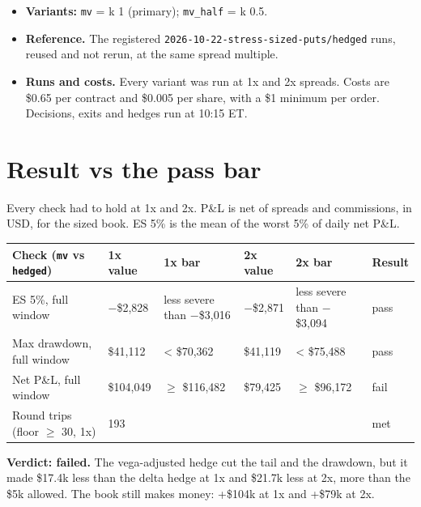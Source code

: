 \documentclass{article}
\begin{document}
\begin{itemize}
\begin{itemize}
\end{itemize}

\item \textbf{Variants:} \texttt{mv} = k 1 (primary); \texttt{mv\_\allowbreak{}half} = k 0.5.

\item \textbf{Reference.} The registered \texttt{2026-\allowbreak{}10-\allowbreak{}22-\allowbreak{}stress-\allowbreak{}sized-\allowbreak{}puts/\allowbreak{}hedged} runs, reused and not rerun, at the same spread multiple.

\item \textbf{Runs and costs.} Every variant was run at 1x and 2x spreads. Costs are \$0.65 per contract and \$0.005 per share, with a \$1 minimum per order. Decisions, exits and hedges run at 10:15 ET.

\end{itemize}

\section{Result vs the pass bar}

Every check had to hold at 1x and 2x. P\&L is net of spreads and commissions, in USD, for the sized book. ES 5\% is the mean of the worst 5\% of daily net P\&L.

\begin{center}\small
\begin{tabularx}{\linewidth}{>{\raggedright\arraybackslash}X l >{\raggedright\arraybackslash}X l >{\raggedright\arraybackslash}X l}
\toprule
\textbf{Check (\texttt{mv} vs \texttt{hedged})} & \textbf{1x value} & \textbf{1x bar} & \textbf{2x value} & \textbf{2x bar} & \textbf{Result} \\
\midrule
ES 5\%, full window & \ensuremath{-}\$2,828 & less severe than \ensuremath{-}\$3,016 & \ensuremath{-}\$2,871 & less severe than \ensuremath{-}\$3,094 & pass \\
Max drawdown, full window & \$41,112 & < \$70,362 & \$41,119 & < \$75,488 & pass \\
Net P\&L, full window & \$104,049 & \ensuremath{\geq} \$116,482 & \$79,425 & \ensuremath{\geq} \$96,172 & fail \\
Round trips (floor \ensuremath{\geq} 30, 1x) & 193 &  &  &  & met \\
\bottomrule
\end{tabularx}
\end{center}

\textbf{Verdict: failed.} The vega-adjusted hedge cut the tail and the drawdown, but it made \$17.4k less than the delta hedge at 1x and \$21.7k less at 2x, more than the \$5k allowed. The book still makes money: +\$104k at 1x and +\$79k at 2x.
\end{document}
